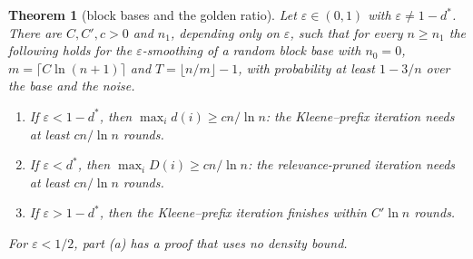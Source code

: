 \documentclass[11pt]{amsart}
\newtheorem{theorem}{Theorem}
\theoremstyle{definition}
\theoremstyle{remark}
\newcommand{\eps}{\varepsilon}
\begin{document}
\begin{theorem}[block bases and the golden ratio]\label{thm:block}
Let $\eps\in(0,1)$ with $\eps\ne1-d^*$. There are $C,C',c>0$ and $n_1$, depending only on $\eps$, such
that for every $n\ge n_1$ the following holds for the $\eps$-smoothing of a random block base with
$n_0=0$, $m=\lceil C\ln(n+1)\rceil$ and $T=\lfloor n/m\rfloor-1$, with probability at least
$1-3/n$ over the base and the noise.
\begin{enumerate}[label=(\alph*),leftmargin=2.4em]
\item If $\eps<1-d^*$, then $\max_id(i)\ge cn/\ln n$: the Kleene--prefix iteration needs at least
$cn/\ln n$ rounds.
\item If $\eps<d^*$, then $\max_iD(i)\ge cn/\ln n$: the relevance-pruned iteration needs at least
$cn/\ln n$ rounds.
\item If $\eps>1-d^*$, then the Kleene--prefix iteration finishes within $C'\ln n$ rounds.
\end{enumerate}
For $\eps<1/2$, part (a) has a proof that uses no density bound.
\end{theorem}
\end{document}
